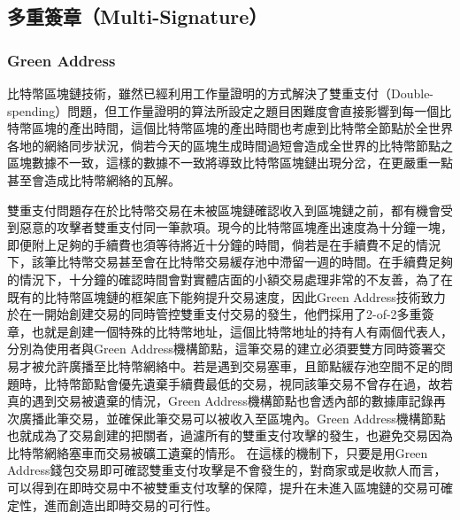 		\subsection{多重簽章（Multi-Signature）}
		 	\subsubsection{Green Address}
		 	比特幣區塊鏈技術，雖然已經利用工作量證明的方式解決了雙重支付（Double-spending）問題\supercite{Informationpropagationinthebitcoinnetwork}\supercite{Double-spendingfastpaymentsinbitcoin}，但工作量證明的算法所設定之題目困難度會直接影響到每一個比特幣區塊的產出時間，這個比特幣區塊的產出時間也考慮到比特幣全節點於全世界各地的網絡同步狀況，倘若今天的區塊生成時間過短會造成全世界的比特幣節點之區塊數據不一致，這樣的數據不一致將導致比特幣區塊鏈出現分岔，在更嚴重一點甚至會造成比特幣網絡的瓦解。

		 	雙重支付問題存在於比特幣交易在未被區塊鏈確認收入到區塊鏈之前，都有機會受到惡意的攻擊者雙重支付同一筆款項。現今的比特幣區塊產出速度為十分鐘一塊，即便附上足夠的手續費也須等待將近十分鐘的時間，倘若是在手續費不足的情況下，該筆比特幣交易甚至會在比特幣交易緩存池中滯留一週的時間。在手續費足夠的情況下，十分鐘的確認時間會對實體店面的小額交易處理非常的不友善，為了在既有的比特幣區塊鏈的框架底下能夠提升交易速度，因此Green Address技術致力於在一開始創建交易的同時管控雙重支付交易的發生，他們採用了2-of-2多重簽章，也就是創建一個特殊的比特幣地址，這個比特幣地址的持有人有兩個代表人，分別為使用者與Green Address機構節點，這筆交易的建立必須要雙方同時簽署交易才被允許廣播至比特幣網絡中。若是遇到交易塞車，且節點緩存池空間不足的問題時，比特幣節點會優先遺棄手續費最低的交易，視同該筆交易不曾存在過，故若真的遇到交易被遺棄的情況，Green Address機構節點也會透內部的數據庫記錄再次廣播此筆交易，並確保此筆交易可以被收入至區塊內。Green Address機構節點也就成為了交易創建的把關者，過濾所有的雙重支付攻擊的發生，也避免交易因為比特幣網絡塞車而交易被礦工遺棄的情形。
		 	在這樣的機制下，只要是用Green Address錢包交易即可確認雙重支付攻擊是不會發生的，對商家或是收款人而言，可以得到在即時交易中不被雙重支付攻擊的保障，提升在未進入區塊鏈的交易可確定性，進而創造出即時交易的可行性。

